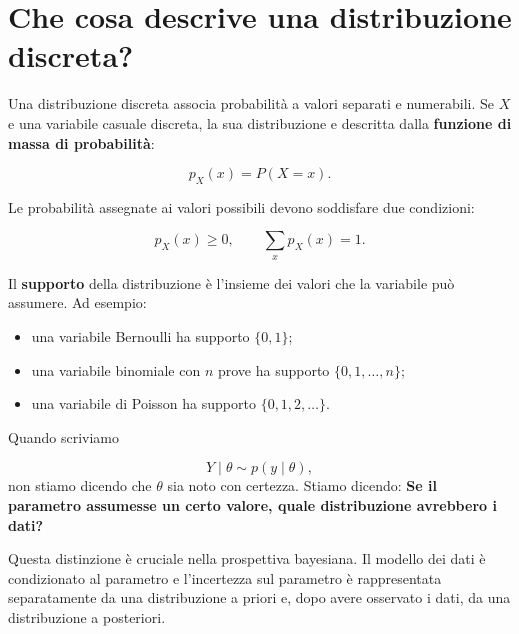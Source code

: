 \documentclass[
  italian,
  letterpaper,
  a4paper,
  11pt,
  open=any]{scrbook}
\providecommand{\tightlist}{%
  \setlength{\itemsep}{0pt}\setlength{\parskip}{0pt}}
\theoremstyle{plain}
\theoremstyle{definition}
\theoremstyle{definition}
\theoremstyle{remark}
\begin{document}
\section{Che cosa descrive una distribuzione
discreta?}\label{sec-discrete-distribution-meaning}

Una distribuzione discreta associa probabilità a valori separati e
numerabili. Se \(X\) e una variabile casuale discreta, la sua
distribuzione e descritta dalla \textbf{funzione di massa di
probabilità}:

\[
p_X(x) = P(X = x).
\]

Le probabilità assegnate ai valori possibili devono soddisfare due
condizioni:

\[
p_X(x) \geq 0, \qquad \sum_x p_X(x) = 1.
\]

Il \textbf{supporto} della distribuzione è l'insieme dei valori che la
variabile può assumere. Ad esempio:

\begin{itemize}
\tightlist
\item
  una variabile Bernoulli ha supporto \(\{0,1\}\);
\item
  una variabile binomiale con \(n\) prove ha supporto
  \(\{0,1,\ldots,n\}\);
\item
  una variabile di Poisson ha supporto \(\{0,1,2,\ldots\}\).
\end{itemize}

\begin{tcolorbox}[enhanced jigsaw, arc=.35mm, bottomrule=.15mm, bottomtitle=1mm, breakable, colback=white, colbacktitle=quarto-callout-important-color!10!white, colframe=quarto-callout-important-color-frame, coltitle=black, left=2mm, leftrule=.75mm, opacityback=0, opacitybacktitle=0.6, rightrule=.15mm, title=\textcolor{quarto-callout-important-color}{\faExclamation}\hspace{0.5em}{Modello condizionale, non certezza sul parametro}, titlerule=0mm, toprule=.15mm, toptitle=1mm]

Quando scriviamo

\[
Y \mid \theta \sim p(y \mid \theta),
\] non stiamo dicendo che \(\theta\) sia noto con certezza. Stiamo
dicendo: \textbf{Se il parametro assumesse un certo valore, quale
distribuzione avrebbero i dati?}

Questa distinzione è cruciale nella prospettiva bayesiana. Il modello
dei dati è condizionato al parametro e l'incertezza sul parametro è
rappresentata separatamente da una distribuzione a priori e, dopo avere
osservato i dati, da una distribuzione a posteriori.

\end{tcolorbox}
\end{document}
